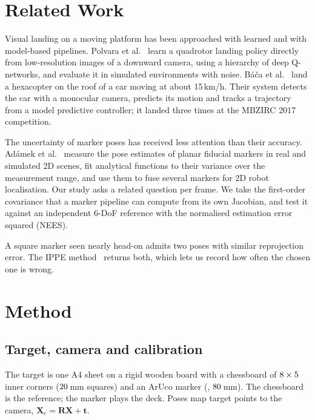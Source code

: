 \documentclass[conference]{IEEEtran}
\newcommand{\vect}[1]{\mathbf{#1}}
\begin{document}
\section{Related Work}
Visual landing on a moving platform has been approached with learned and with model-based
pipelines. Polvara et al.~\cite{polvara2018} learn a quadrotor landing policy directly from
low-resolution images of a downward camera, using a hierarchy of deep Q-networks, and evaluate it
in simulated environments with noise. Báča et al.~\cite{baca2019} land a hexacopter on the roof of a
car moving at about 15\,km/h. Their system detects the car with a monocular camera, predicts its
motion and tracks a trajectory from a model predictive controller; it landed three times at the
MBZIRC 2017 competition.

The uncertainty of marker poses has received less attention than their accuracy. Adámek et
al.~\cite{adamek2023} measure the pose estimates of planar fiducial markers in real and simulated 2D
scenes, fit analytical functions to their variance over the measurement range, and use them to fuse
several markers for 2D robot localisation. Our study asks a related question per frame. We take the
first-order covariance that a marker pipeline can compute from its own Jacobian, and test it against
an independent 6-DoF reference with the normalised estimation error squared (NEES).

A square marker seen nearly head-on admits two poses with similar reprojection error. The IPPE
method~\cite{collins2014} returns both, which lets us record how often the chosen one is wrong.

\section{Method}

\subsection{Target, camera and calibration}
The target is one A4 sheet on a rigid wooden board with a chessboard of
$8\times5$ inner corners ($20$\,mm squares) and an ArUco marker
(\geoDictionary, $80$\,mm). The chessboard is the reference; the marker plays the deck. Poses
map target points to the camera, $\vect{X}_c = \vect{R}\vect{X} + \vect{t}$.
\end{document}
